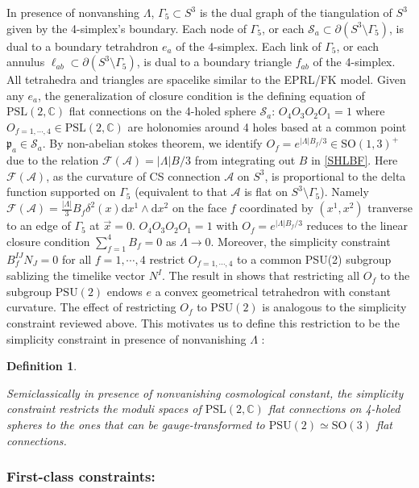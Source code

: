\documentclass[aps,prd,notitlepage,nofootinbib,superscriptaddress,groupedaddress,twocolumn]{revtex4-1}
\newtheorem{definition}{Definition}[section]
\newcommand{\PSlc}{\mathrm{PSL}(2,\mathbb{C})}
\newcommand{\PSu}{\mathrm{PSU}(2)}
\newcommand{\ca}{\mathcal A}
\newcommand{\cf}{\mathcal F}
\newcommand{\cs}{\mathcal S}
\newcommand{\fp}{\mathfrak{p}}  \newcommand{\Fp}{\mathfrak{P}}
\newcommand{\G}{\Gamma}
\renewcommand{\L }{\Lambda}
\newcommand{\rmd}{\mathrm d}
\begin{document}
In presence of nonvanshing $\L$, $\G_5\subset S^3$ is the dual graph of the tiangulation of $S^3$ given by the 4-simplex's boundary. Each node of $\G_5$, or each $\cs_a\subset\partial(S^3\setminus\G_5)$, is dual to a boundary tetrahdron $e_a$ of the 4-simplex. Each link of $\G_5$, or each annulus $\ell_{ab}\subset\partial(S^3\setminus\G_5)$, is dual to a boundary triangle $f_{ab}$ of the 4-simplex. All tetrahedra and triangles are spacelike similar to the EPRL/FK model. Given any $e_a$, the generalization of closure condition is the defining equation of $\PSlc$ flat connections on the 4-holed sphere $\cs_a$: $O_4O_3O_2O_1=1$ where $O_{f=1,\cdots,4}\in\PSlc$ are holonomies around 4 holes based at a common point $\fp_a\in\cs_a$. By non-abelian stokes theorem, we identify $O_f=e^{|\L| B_f/3}\in \mathrm{SO}(1,3)^+$ due to the relation $\cf(\ca)=|\L| B/3$ from integrating out $B$ in \eqref{SHLBF}. Here $\cf(\ca)$, as the curvature of CS connection $\ca$ on $S^3$, is proportional to the delta function supported on $\G_5$ (equivalent to that $\ca$ is flat on $S^3\setminus\G_5$). Namely $\cf(\ca)=\frac{|\L|}{3}B_f\delta^2(x)\rmd x^1\wedge \rmd x^2 $ on the face $f$ coordinated by $(x^1,x^2)$ tranverse to an edge of $\G_5$ at $\vec{x}=0$. $O_4O_3O_2O_1=1$ with $O_f=e^{|\L| B_f/3}$ reduces to the linear closure condition $\sum_{f=1}^4B_f=0$ as $\L\to 0$. Moreover, the simplicity constraint $B^{IJ}_fN_J=0$ for all $f=1,\cdots,4$ restrict $O_{f=1,\cdots,4}$ to a common PSU(2) subgroup sablizing the timelike vector $N^I$. The result in \cite{curvedMink} shows that restricting all $O_f$ to the subgroup $\PSu$ endows $e$ a convex geometrical tetrahedron with constant curvature. The effect of restricting $O_f$ to $\PSu$ is analogous to the simplicity constraint reviewed above. This motivates us to define this restriction to be the simplicity constraint in presence of nonvanishing $\L$ \cite{Han:2017geu}:


\begin{definition}\label{simplicity}

Semiclassically in presence of nonvanishing cosmological constant, the simplicity constraint restricts the moduli spaces of $\PSlc$ flat connections on 4-holed spheres to the ones that can be gauge-transformed to $\PSu\simeq \mathrm{SO}(3)$ flat connections. 

\end{definition}


\subsubsection{First-class constraints:}
\end{document}
